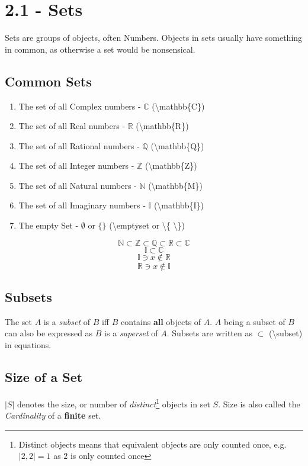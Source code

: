 \documentclass{article}
\begin{document}
    \section{2.1 - Sets}
        Sets are groups of objects, often Numbers.
        Objects in sets usually have something in common, as otherwise a set would be nonsensical.
        \subsection{Common Sets}
            \begin{enumerate}
                \item The set of all Complex numbers - $\mathbb{C}$ (\textbackslash mathbb\{C\})
                \item The set of all Real numbers - $\mathbb{R}$ (\textbackslash mathbb\{R\})
                \item The set of all Rational numbers - $\mathbb{Q}$ (\textbackslash mathbb\{Q\})
                \item The set of all Integer numbers - $\mathbb{Z}$ (\textbackslash mathbb\{Z\})
                \item The set of all Natural numbers - $\mathbb{N}$ (\textbackslash mathbb\{M\})
                \item The set of all Imaginary numbers - $\mathbb{I}$ (\textbackslash mathbb\{I\})
                \item The empty Set - $\emptyset$ or $\{\}$ (\textbackslash emptyset or \textbackslash \{ \textbackslash \})
            \end{enumerate}
            $$\mathbb{N} \subset \mathbb{Z} \subset \mathbb{Q} \subset \mathbb{R} \subset \mathbb{C}$$
            $$\mathbb{I} \subset \mathbb{C}$$
            $$\mathbb{I} \ni x \notin \mathbb{R}$$
            $$\mathbb{R} \ni x \notin \mathbb{I}$$
        \subsection{Subsets}
            The set $A$ is a \textit{subset} of $B$ iff $B$ contains \textbf{all} objects of $A$.
            $A$ being a subset of $B$ can also be expressed as $B$ is a \textit{superset} of $A$.
            Subsets are written as $\subset$ (\textbackslash subset) in equations.
        \subsection{Size of a Set}
            $| S |$ denotes the size, or number of \textit{distinct}\footnote{Distinct objects means that equivalent objects are only counted once, e.g. $|{2, 2}| = 1$ as $2$ is only counted once} objects in set $S$.
            Size is also called the \textit{Cardinality} of a \textbf{finite} set.
\end{document}
